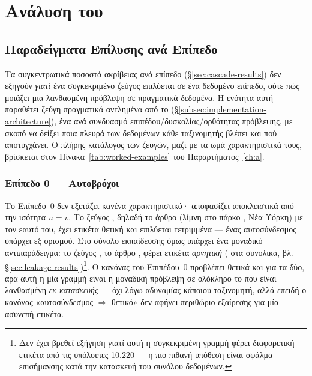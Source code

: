 \section{Ανάλυση του }
\label{sec:hard-residual}

\subsection{Παραδείγματα Επίλυσης ανά Επίπεδο}
\label{subsec:tier-examples}

Τα συγκεντρωτικά ποσοστά ακρίβειας ανά επίπεδο (\S\ref{sec:cascade-results}) δεν
εξηγούν \textit{γιατί} ένα συγκεκριμένο ζεύγος επιλύεται σε ένα δεδομένο επίπεδο,
ούτε πώς μοιάζει μια λανθασμένη πρόβλεψη σε πραγματικά δεδομένα.
Η ενότητα αυτή παραθέτει ζεύγη πραγματικά αντλημένα από το
\texttt{} (\S\ref{subsec:implementation-architecture}), ένα ανά
συνδυασμό επιπέδου/δυσκολίας/ορθότητας πρόβλεψης, με σκοπό να δείξει ποια πλευρά
των δεδομένων κάθε ταξινομητής βλέπει και πού αποτυγχάνει.
Ο πλήρης κατάλογος
των ζευγών, μαζί με τα ωμά χαρακτηριστικά τους, βρίσκεται στον
Πίνακα~\ref{tab:worked-examples} του Παραρτήματος~\ref{ch:a}.

\subsubsection{Επίπεδο 0 --- Αυτοβρόχοι}

Το Επίπεδο~0 δεν εξετάζει κανένα χαρακτηριστικό· αποφασίζει αποκλειστικά από την
ισότητα $u = v$.
Το ζεύγος , δηλαδή το άρθρο 
(λίμνη στο πάρκο , Νέα Υόρκη) με τον εαυτό του, έχει ετικέτα θετική
και επιλύεται τετριμμένα --- ένας αυτοσύνδεσμος υπάρχει εξ ορισμού.
Στο σύνολο
εκπαίδευσης όμως υπάρχει ένα μοναδικό αντιπαράδειγμα: το ζεύγος
, το άρθρο , φέρει ετικέτα
\textit{αρνητική} (\SelfLoopsTrainNeg{} στα \SelfLoopsTrain{} συνολικά, βλ.
\S\ref{sec:leakage-results})\footnote{Δεν έχει βρεθεί εξήγηση γιατί αυτή η
συγκεκριμένη γραμμή φέρει διαφορετική ετικέτα από τις υπόλοιπες 10.220 --- η πιο
πιθανή υπόθεση είναι σφάλμα επισήμανσης κατά την κατασκευή του συνόλου δεδομένων.}.
Ο κανόνας του Επιπέδου~0 προβλέπει θετικά και για τα δύο, άρα αυτή η μία γραμμή
είναι η μοναδική πρόβλεψη σε ολόκληρο το  που είναι λανθασμένη \textit{εκ
κατασκευής} --- όχι λόγω αδυναμίας κάποιου ταξινομητή, αλλά επειδή ο κανόνας
«αυτοσύνδεσμος $\Rightarrow$ θετικό» δεν αφήνει περιθώριο εξαίρεσης για μία ασυνεπή
ετικέτα.

